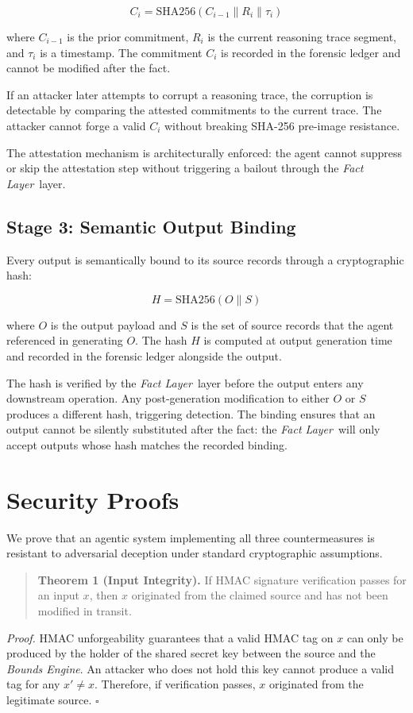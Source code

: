 \documentclass[12pt]{article}
\newcommand{\bounds}{\textit{Bounds Engine}}
\newcommand{\fact}{\textit{Fact Layer}}
\begin{document}
$$C_i = \text{SHA256}(C_{i-1} \parallel R_i \parallel \tau_i)$$

where $C_{i-1}$ is the prior commitment, $R_i$ is the current reasoning trace segment, and $\tau_i$ is a timestamp. The commitment $C_i$ is recorded in the forensic ledger and cannot be modified after the fact.

If an attacker later attempts to corrupt a reasoning trace, the corruption is detectable by comparing the attested commitments to the current trace. The attacker cannot forge a valid $C_i$ without breaking SHA-256 pre-image resistance.

The attestation mechanism is architecturally enforced: the agent cannot suppress or skip the attestation step without triggering a bailout through the \fact\ layer.

\subsection{Stage 3: Semantic Output Binding}

Every output is semantically bound to its source records through a cryptographic hash:

$$H = \text{SHA256}(O \parallel S)$$

where $O$ is the output payload and $S$ is the set of source records that the agent referenced in generating $O$. The hash $H$ is computed at output generation time and recorded in the forensic ledger alongside the output.

The hash is verified by the \fact\ layer before the output enters any downstream operation. Any post-generation modification to either $O$ or $S$ produces a different hash, triggering detection. The binding ensures that an output cannot be silently substituted after the fact: the \fact\ will only accept outputs whose hash matches the recorded binding.

\section{Security Proofs}
\label{sec:securityproofs}

We prove that an agentic system implementing all three countermeasures is resistant to adversarial deception under standard cryptographic assumptions.

\begin{quote}
\textbf{Theorem 1 (Input Integrity).} If HMAC signature verification passes for an input $x$, then $x$ originated from the claimed source and has not been modified in transit.
\end{quote}
\textit{Proof.} HMAC unforgeability guarantees that a valid HMAC tag on $x$ can only be produced by the holder of the shared secret key between the source and the \bounds. An attacker who does not hold this key cannot produce a valid tag for any $x' \neq x$. Therefore, if verification passes, $x$ originated from the legitimate source. $\square$
\end{document}
